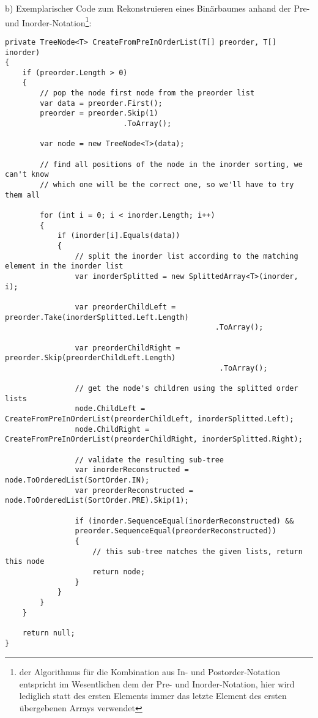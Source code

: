 b) Exemplarischer Code zum Rekonstruieren eines Binärbaumes anhand der Pre- und Inorder-Notation\footnote{der Algorithmus für die Kombination aus In- und Postorder-Notation entspricht im Wesentlichen dem der Pre- und Inorder-Notation, hier wird lediglich statt des ersten Elements immer das letzte Element des ersten übergebenen Arrays verwendet}: \\
\begin{verbatim}
private TreeNode<T> CreateFromPreInOrderList(T[] preorder, T[] inorder)
{
    if (preorder.Length > 0)
    {
        // pop the node first node from the preorder list
        var data = preorder.First();
        preorder = preorder.Skip(1)
                           .ToArray();

        var node = new TreeNode<T>(data);

        // find all positions of the node in the inorder sorting, we can't know
        // which one will be the correct one, so we'll have to try them all

        for (int i = 0; i < inorder.Length; i++)
        {
            if (inorder[i].Equals(data))
            {
                // split the inorder list according to the matching element in the inorder list
                var inorderSplitted = new SplittedArray<T>(inorder, i);
                
                var preorderChildLeft = preorder.Take(inorderSplitted.Left.Length)
                                                .ToArray();

                var preorderChildRight = preorder.Skip(preorderChildLeft.Length)
                                                 .ToArray();

                // get the node's children using the splitted order lists
                node.ChildLeft = CreateFromPreInOrderList(preorderChildLeft, inorderSplitted.Left);
                node.ChildRight = CreateFromPreInOrderList(preorderChildRight, inorderSplitted.Right);

                // validate the resulting sub-tree
                var inorderReconstructed = node.ToOrderedList(SortOrder.IN);
                var preorderReconstructed = node.ToOrderedList(SortOrder.PRE).Skip(1);

                if (inorder.SequenceEqual(inorderReconstructed) &&
                preorder.SequenceEqual(preorderReconstructed))
                {
                    // this sub-tree matches the given lists, return this node
                    return node;
                }
            }
        }
    }
    
    return null;
}
\end{verbatim}